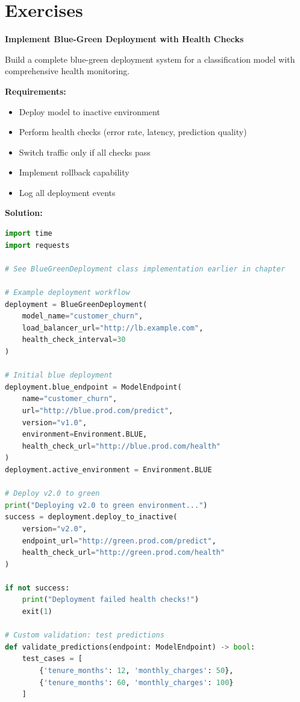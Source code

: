 \section{Exercises}

\begin{exercise}
\textbf{Implement Blue-Green Deployment with Health Checks}

Build a complete blue-green deployment system for a classification model with comprehensive health monitoring.

\textbf{Requirements:}
\begin{itemize}
    \item Deploy model to inactive environment
    \item Perform health checks (error rate, latency, prediction quality)
    \item Switch traffic only if all checks pass
    \item Implement rollback capability
    \item Log all deployment events
\end{itemize}

\textbf{Solution:}

\begin{lstlisting}[language=Python]
import time
import requests

# See BlueGreenDeployment class implementation earlier in chapter

# Example deployment workflow
deployment = BlueGreenDeployment(
    model_name="customer_churn",
    load_balancer_url="http://lb.example.com",
    health_check_interval=30
)

# Initial blue deployment
deployment.blue_endpoint = ModelEndpoint(
    name="customer_churn",
    url="http://blue.prod.com/predict",
    version="v1.0",
    environment=Environment.BLUE,
    health_check_url="http://blue.prod.com/health"
)
deployment.active_environment = Environment.BLUE

# Deploy v2.0 to green
print("Deploying v2.0 to green environment...")
success = deployment.deploy_to_inactive(
    version="v2.0",
    endpoint_url="http://green.prod.com/predict",
    health_check_url="http://green.prod.com/health"
)

if not success:
    print("Deployment failed health checks!")
    exit(1)

# Custom validation: test predictions
def validate_predictions(endpoint: ModelEndpoint) -> bool:
    test_cases = [
        {'tenure_months': 12, 'monthly_charges': 50},
        {'tenure_months': 60, 'monthly_charges': 100}
    ]


\end{lstlisting}
\end{exercise}
